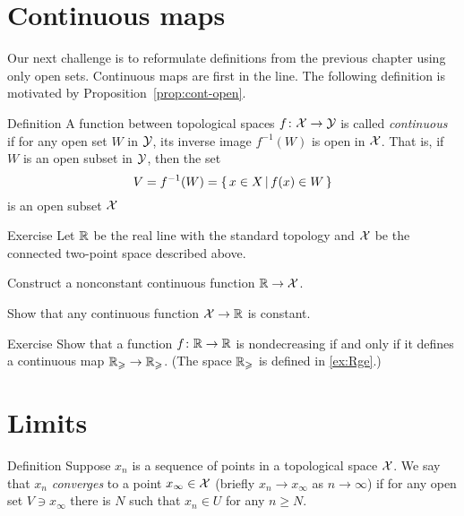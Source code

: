 \section{Continuous maps}

Our next challenge is to reformulate definitions from the previous chapter using only open sets.
Continuous maps are first in the line.
The following definition is motivated by Proposition~\ref{prop:cont-open}.

\begin{thm}{Definition}\label{def:cont-top}
A function between topological spaces 
$f\colon\mathcal{X}\to\mathcal{Y}$ is called \emph{continuous} if for any open set $W$ in $\mathcal{Y}$, its inverse image $f^{-1}(W)$ is open in $\mathcal{X}$.
That is, if $W$ is an open subset in $\mathcal{Y}$, then the set
\[V=f^{-1}(W)=\left\{\,{x\in X}\,\middle|\,{f(x)\in W}\,\right\}\]
is an open subset $\mathcal{X}$
\end{thm}

\begin{thm}{Exercise}
Let $\mathbb{R}$ be the real line with the standard topology
and $\mathcal{X}$ be the connected two-point space described above.

\begin{subthm}{}
Construct a nonconstant continuous function $\mathbb{R}\to \mathcal{X}$.
\end{subthm}

\begin{subthm}{}
Show that any continuous function $\mathcal{X}\to \mathbb{R}$ is constant.
\end{subthm}

\end{thm}

\begin{thm}{Exercise} 
Show that a function $f\colon\mathbb{R}\to\mathbb{R}$ is nondecreasing if and only if it defines a continuous map $\mathbb{R}_\geqslant\to \mathbb{R}_\geqslant$.
(The space $\mathbb{R}_\geqslant$ is defined in \ref{ex:Rge}.)
\end{thm}

\section{Limits}

\begin{thm}{Definition}\label{def:limit-top}
Suppose $x_n$ is a sequence of points in a topological space $\mathcal{X}$.
We say that $x_n$ \emph{converges} to a point $x_\infty\in \mathcal{X}$ (briefly $x_n\to x_\infty$ as $n\to\infty$) if for any open set $V\ni x_\infty$ there is $N$ such that 
$x_n\in U$ for any $n\ge N$.
\end{thm}

